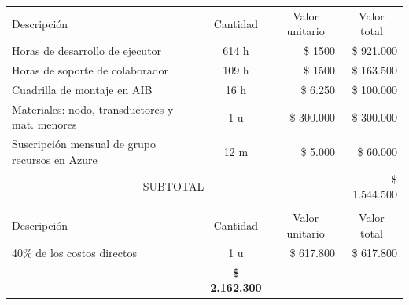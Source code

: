 \documentclass[
11pt, %
]{charter}
\begin{document}
\begin{table}[htpb]
\centering
\begin{tabularx}{\linewidth}{@{}|X|c|r|r|@{}}
\hline
\rowcolor[HTML]{C0C0C0} 
\multicolumn{4}{|c|}{\cellcolor[HTML]{C0C0C0}COSTOS DIRECTOS} \\ \hline
\rowcolor[HTML]{C0C0C0} 
Descripción &
  \multicolumn{1}{c|}{\cellcolor[HTML]{C0C0C0}Cantidad} &
  \multicolumn{1}{c|}{\cellcolor[HTML]{C0C0C0}Valor unitario} &
  \multicolumn{1}{c|}{\cellcolor[HTML]{C0C0C0}Valor total} \\ \hline
 Horas de desarrollo de ejecutor &
  
  \multicolumn{1}{c|}{614 h} &
  \multicolumn{1}{r|}{\$ 1500} &
  \multicolumn{1}{r|}{\$ 921.000} \\ \hline
 Horas de soporte de colaborador &
  \multicolumn{1}{c|}{109 h} &
  \multicolumn{1}{r|}{\$ 1500} &
  \multicolumn{1}{r|}{\$ 163.500} \\ \hline
\multicolumn{1}{|l|}{Cuadrilla de montaje en AIB} 
	& {16 h}
   & \multicolumn{1}{r|}{\$ 6.250}
   & \multicolumn{1}{r|}{\$ 100.000}
   \\ \hline
\multicolumn{1}{|l|}{Materiales: nodo, transductores y mat. menores} 
	& {1 u}
   & \multicolumn{1}{r|}{\$ 300.000}
   & \multicolumn{1}{r|}{\$ 300.000}
   \\ \hline
\multicolumn{1}{|l|}{Suscripción mensual de grupo recursos en Azure} 
	& {12 m}
   & \multicolumn{1}{r|}{\$ 5.000}
   & \multicolumn{1}{r|}{\$ 60.000}
   \\ \hline
\multicolumn{3}{|c|}{SUBTOTAL} &
  \multicolumn{1}{r|}{\$ 1.544.500} \\ \hline
\rowcolor[HTML]{C0C0C0} 
\multicolumn{4}{|c|}{\cellcolor[HTML]{C0C0C0}COSTOS INDIRECTOS} \\ \hline
\rowcolor[HTML]{C0C0C0} 
Descripción &
  \multicolumn{1}{c|}{\cellcolor[HTML]{C0C0C0}Cantidad} &
  \multicolumn{1}{c|}{\cellcolor[HTML]{C0C0C0}Valor unitario} &
  \multicolumn{1}{c|}{\cellcolor[HTML]{C0C0C0}Valor total} \\ \hline
40\% de los costos directos
   & {1 u}
   & {\$ 617.800}
   & {\$ 617.800}
   \\ 
   \hline
\rowcolor[HTML]{C0C0C0}
\multicolumn{3}{|c|}{TOTAL} & \textbf{\$ 2.162.300}
   \\ \hline
\end{tabularx}%
\end{table}
\end{document}
